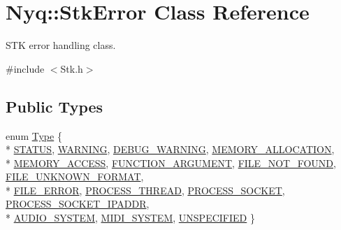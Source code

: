 \hypertarget{class_nyq_1_1_stk_error}{}\section{Nyq\+:\+:Stk\+Error Class Reference}
\label{class_nyq_1_1_stk_error}


S\+TK error handling class.  




{\ttfamily \#include $<$Stk.\+h$>$}

\subsection*{Public Types}
\begin{DoxyCompactItemize}
\item 
enum \hyperlink{class_nyq_1_1_stk_error_a5fde28aabab32abdb02b1078542bd3e8}{Type} \{ \\*
\hyperlink{class_nyq_1_1_stk_error_a5fde28aabab32abdb02b1078542bd3e8a8ae5fde23103613cabf67c27122197c5}{S\+T\+A\+T\+US}, 
\hyperlink{class_nyq_1_1_stk_error_a5fde28aabab32abdb02b1078542bd3e8acb482764c9cbdc9579619325193c75a8}{W\+A\+R\+N\+I\+NG}, 
\hyperlink{class_nyq_1_1_stk_error_a5fde28aabab32abdb02b1078542bd3e8a5ad59dbe683a83e25204441f561b5de2}{D\+E\+B\+U\+G\+\_\+\+W\+A\+R\+N\+I\+NG}, 
\hyperlink{class_nyq_1_1_stk_error_a5fde28aabab32abdb02b1078542bd3e8a31ca6a1bb1a506433f3caf10168291f2}{M\+E\+M\+O\+R\+Y\+\_\+\+A\+L\+L\+O\+C\+A\+T\+I\+ON}, 
\\*
\hyperlink{class_nyq_1_1_stk_error_a5fde28aabab32abdb02b1078542bd3e8a14a373e546de2e5a92e4eeba89857f2d}{M\+E\+M\+O\+R\+Y\+\_\+\+A\+C\+C\+E\+SS}, 
\hyperlink{class_nyq_1_1_stk_error_a5fde28aabab32abdb02b1078542bd3e8a4339d7920a5723176c3d127f7e5aa96d}{F\+U\+N\+C\+T\+I\+O\+N\+\_\+\+A\+R\+G\+U\+M\+E\+NT}, 
\hyperlink{class_nyq_1_1_stk_error_a5fde28aabab32abdb02b1078542bd3e8ada6240aef70979839fc38497b0eaf653}{F\+I\+L\+E\+\_\+\+N\+O\+T\+\_\+\+F\+O\+U\+ND}, 
\hyperlink{class_nyq_1_1_stk_error_a5fde28aabab32abdb02b1078542bd3e8a9afff945f96870ad3a4833ac94b7adf0}{F\+I\+L\+E\+\_\+\+U\+N\+K\+N\+O\+W\+N\+\_\+\+F\+O\+R\+M\+AT}, 
\\*
\hyperlink{class_nyq_1_1_stk_error_a5fde28aabab32abdb02b1078542bd3e8a09ac62e9c1f768bc9b0718edba070890}{F\+I\+L\+E\+\_\+\+E\+R\+R\+OR}, 
\hyperlink{class_nyq_1_1_stk_error_a5fde28aabab32abdb02b1078542bd3e8a9a18a1df5e3227748e84959ad537169a}{P\+R\+O\+C\+E\+S\+S\+\_\+\+T\+H\+R\+E\+AD}, 
\hyperlink{class_nyq_1_1_stk_error_a5fde28aabab32abdb02b1078542bd3e8a2ca32866808797f4589d8f94a6c2e207}{P\+R\+O\+C\+E\+S\+S\+\_\+\+S\+O\+C\+K\+ET}, 
\hyperlink{class_nyq_1_1_stk_error_a5fde28aabab32abdb02b1078542bd3e8a1e278994a0f123aaf94e0576422f5830}{P\+R\+O\+C\+E\+S\+S\+\_\+\+S\+O\+C\+K\+E\+T\+\_\+\+I\+P\+A\+D\+DR}, 
\\*
\hyperlink{class_nyq_1_1_stk_error_a5fde28aabab32abdb02b1078542bd3e8a4a5a883ebabcdf0307d8067188a68ba1}{A\+U\+D\+I\+O\+\_\+\+S\+Y\+S\+T\+EM}, 
\hyperlink{class_nyq_1_1_stk_error_a5fde28aabab32abdb02b1078542bd3e8a146957f92d8ddd2f08073912d964d9b6}{M\+I\+D\+I\+\_\+\+S\+Y\+S\+T\+EM}, 
\hyperlink{class_nyq_1_1_stk_error_a5fde28aabab32abdb02b1078542bd3e8a88bc81315f8a933262d0541a770d005b}{U\+N\+S\+P\+E\+C\+I\+F\+I\+ED}
 \}
\end{DoxyCompactItemize}
